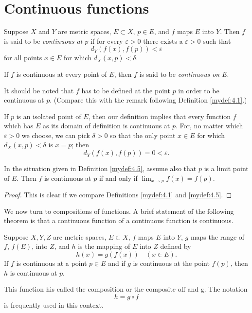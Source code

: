 
\section{Continuous functions}

\begin{mydef}
    \label{mydef:4.5}
    Suppose $X$ and $Y$ are metric spaces, $E \subset X$, $p \in E$, and $f$ maps $E$ into $Y$. Then $f$ is said to be \emph{continuous at $p$} if for every $\varepsilon > 0$ there exists a $\varepsilon > 0$ such that
    \begin{equation*}
        d_Y (f(x), f(p)) < \varepsilon
    \end{equation*}
    for all points $x \in  E$ for which $d_X(x, p) < \delta$.
    
    If $f$ is continuous at every point of $E$, then $f$ is said to be \emph{continuous on $E$}.
    
    It should be noted that $f$ has to be defined at the point $p$ in order to be continuous at $p$. (Compare this with the remark following Definition \ref{mydef:4.1}.)

    If $p$ is an isolated point of $E$, then our definition implies that every function $f$ which has $E$ as its domain of definition is continuous at $p$. For, no matter which $\varepsilon > 0$ we choose, we can pick $\delta > 0$ so that the only point $x \in  E$ for which $d_X(x,p) <\delta$ is $x = p$; then
    \begin{equation*}
        d_Y(f(x),f(p)) = 0 < \varepsilon.
    \end{equation*}
\end{mydef}

\begin{thm}
    \label{thm:4.6}
    In the situation given in Definition \ref{mydef:4.5}, assume also that $p$ is a limit point of $E$. Then $f$ is continuous at $p$ if and only if $\lim_{x \to p}  f(x) = f(p)$.
\end{thm}
\begin{proof}
    This is clear if we compare Definitions \ref{mydef:4.1} and \ref{mydef:4.5}.
\end{proof}


We now turn to compositions of functions. 
A brief statement of the following theorem is that a continuous function of a continuous function is continuous.
\begin{thm}
    \label{thm:4.7}
    Suppose $X, Y, Z$ are metric spaces, $E \subset X$, $f$ maps $E$ into $Y$, $g$ maps the range of $f$, $f(E)$, into $Z$, and $h$ is the mapping of $E$ into $Z$ defined by 
    \begin{equation*}
        h(x) = g(f(x)) \quad
    (x \in  E).
    \end{equation*}
    If $f$ is continuous at a point $p \in E$ and if $g$ is continuous at the point $f(p)$, then $h$ is continuous at $p$.

    This function his called the composition or the composite off and g. The notation
    \begin{equation*}
        h = g \circ f
    \end{equation*}
    is frequently used in this context.
\end{thm}

